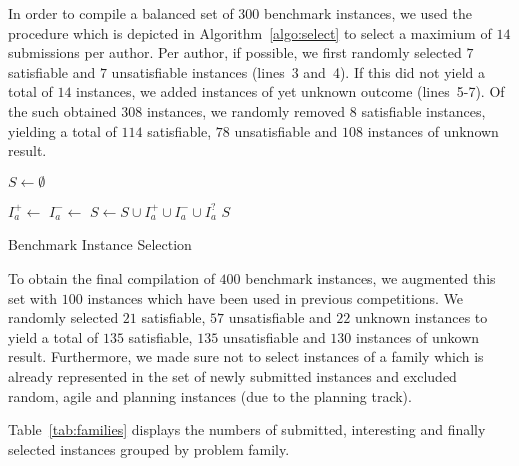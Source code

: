 \documentclass{elsarticle}
\begin{document}
In order to compile a balanced set of $300$ benchmark instances, we used the procedure which is depicted in Algorithm~\ref{algo:select} to select a maximium of $14$ submissions per author. 
Per author, if possible, we first randomly selected $7$ satisfiable and $7$ unsatisfiable instances (lines~3 and~4). 
If this did not yield a total of $14$ instances, we added instances of yet unknown outcome (lines~5-7). 
Of the such obtained $308$ instances, we randomly removed $8$ satisfiable instances, yielding a total of $114$ satisfiable, $78$ unsatisfiable and $108$ instances of unknown result. 

\begin{algorithm}[t]
\DontPrintSemicolon

\BlankLine
$S \leftarrow \emptyset$\;

 {
	$I_a^+ \leftarrow$ \;	
	$I_a^- \leftarrow$ \;	
	$S \leftarrow S \cup I_a^+ \cup I_a^- \cup I_a^?$\;	
}
\Return $S$\;

\caption{Benchmark Instance Selection}
\label{algo:select}
\end{algorithm}

To obtain the final compilation of $400$ benchmark instances, we augmented this set with $100$ instances which have been used in previous competitions. 
We randomly selected $21$ satisfiable, $57$ unsatisfiable and $22$ unknown instances to yield a total of $135$ satisfiable, $135$ unsatisfiable and $130$ instances of unkown result. 
Furthermore, we made sure not to select instances of a family which is already represented in the set of newly submitted instances and excluded random, agile and planning instances (due to the planning track). 

Table~\ref{tab:families} displays the numbers of submitted, interesting and finally selected instances grouped by problem family. 
\end{document}

